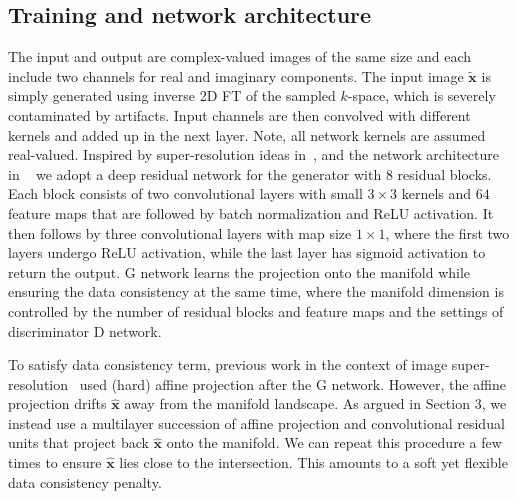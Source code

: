 \documentclass{journal}
\def \bx {\mathbf{x}}
\begin{document}
\subsection{Training and network architecture}
\label{subsec:training}
%
The input and output are complex-valued images of the same size and each include two channels for real and imaginary components. The input image $\tilde{\bx}$ is simply generated using inverse 2D FT of the sampled $k$-space, which is severely contaminated by artifacts. Input channels are then convolved with different kernels and added up in the next layer. Note, all network kernels are assumed real-valued. Inspired by super-resolution ideas in~\cite{johnson2016, leding et al'16}, and the network architecture in ~\cite{srez} we adopt a deep residual network for the generator with $8$ residual blocks. Each block consists of two convolutional layers with small $3 \times 3$ kernels and $64$ feature maps that are followed by batch normalization and ReLU activation. It then follows by three convolutional layers with map size $1 \times 1$, where the first two layers undergo ReLU activation, while the last layer has sigmoid activation to return the output. G network learns the projection onto the manifold while ensuring the data consistency at the same time, where the manifold dimension is controlled by the number of residual blocks and feature maps and the settings of discriminator D network.


To satisfy data consistency term, previous work in the context of image super-resolution~\cite{Sonderby et al'14} used (hard) affine projection after the G network. However, the affine projection drifts $\hat{\bx}$ away from the manifold landscape. As argued in Section 3, we instead use a multilayer succession of affine projection and convolutional residual units that project back $\hat{\bx}$ onto the manifold. We can repeat this procedure a few times to ensure $\hat{\bx}$ lies close to the intersection. This amounts to a soft yet flexible data consistency penalty. 

 
\end{document}

